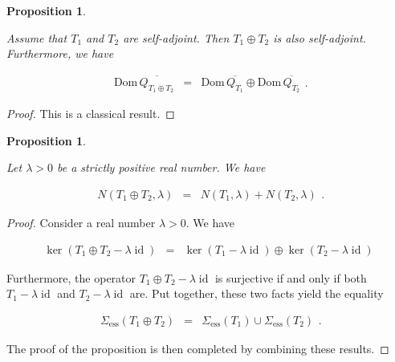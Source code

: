 \documentclass{jams-l}
\newtheorem{proposition}[theorem]{Proposition}
\theoremstyle{definition}
\theoremstyle{remark}
\numberwithin{equation}{section}
\DeclareMathOperator{\id}{id}
\begin{document}
        \begin{proposition}
        \label{PropDomainDirectSum}
        
            Assume that $T_1$ and $T_2$ are self-adjoint. Then $T_1 \oplus T_2$ is also self-adjoint. Furthermore, we have
            
            \[ \begin{array}{lll}
                    \mathrm{Dom} \, \overline{Q_{T_1 \oplus T_2}} & = & \mathrm{Dom} \, \overline{Q_{T_1}} \oplus \mathrm{Dom} \, \overline{Q_{T_2}}
                \end{array} . \]
        
        \end{proposition}
        
        \begin{proof}
        
            This is a classical result.
        
        \end{proof}
        
        \begin{proposition}
        \label{PropSpectralCountingDirectSum}
        
            Let $\lambda > 0$ be a strictly positive real number. We have
            
            \[ \begin{array}{lll}
                    N \left( T_1 \oplus T_2, \lambda \right) & = & N \left( T_1, \lambda \right) + N \left( T_2, \lambda \right)
                \end{array} . \]
        
        \end{proposition}
        
        \begin{proof}
        
            Consider a real number $\lambda > 0$. We have
            
            \[ \begin{array}{lll}
                    \ker \left( T_1 \oplus T_2 - \lambda \id \right) & = & \ker \left( T_1 - \lambda \id \right) \oplus \ker \left( T_2 - \lambda \id \right)
                \end{array} \]
            
            \noindent Furthermore, the operator $T_1 \oplus T_2 - \lambda \id$ is surjective if and only if both $T_1 - \lambda \id$ and $T_2 - \lambda \id$ are. Put together, these two facts yield the equality
            
            \[ \begin{array}{lll}
                    \Sigma_{\mathrm{ess}} \left( T_1 \oplus T_2 \right) & = & \Sigma_{\mathrm{ess}} \left( T_1 \right) \cup \Sigma_{\mathrm{ess}} \left( T_2 \right)
                \end{array} . \]
            
            \noindent The proof of the proposition is then completed by combining these results.
        
        \end{proof}
         
\end{document}
